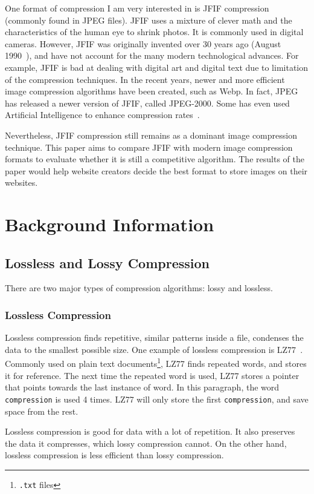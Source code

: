 \documentclass{article}
\begin{document}
One format of compression I am very interested in is JFIF compression (commonly found in JPEG files).
JFIF uses a mixture of clever math and the characteristics of the human eye to shrink photos.
It is commonly used in digital cameras.
However, JFIF was originally invented over 30 years ago (August 1990~\autocite{jpeg}), and have not account for the many modern technological advances.
For example, JFIF is bad at dealing with digital art and digital text due to limitation of the compression techniques.
In the recent years, newer and more efficient image compression algorithms have been created, such as Webp. 
In fact, JPEG has released a newer version of JFIF, called JPEG-2000.
Some has even used Artificial Intelligence to enhance compression rates~\autocite{googleAI}.

Nevertheless, JFIF compression still remains as a dominant image compression technique.
This paper aims to compare JFIF with modern image compression formats to evaluate whether it is still a competitive algorithm.
The results of the paper would help website creators decide the best format to store images on their websites.

\section{Background Information}

\subsection{Lossless and Lossy Compression}
\noindent There are two major types of compression algorithms: lossy and lossless.

\subsubsection{Lossless Compression}
Lossless compression finds repetitive, similar patterns inside a file, condenses the data to the smallest possible size.
One example of lossless compression is LZ77~\autocite{lzYT}.
Commonly used on plain text documents\footnote{\texttt{.txt} files}, LZ77 finds repeated words, and stores it for reference.
The next time the repeated word is used, LZ77 stores a pointer that points towards the last instance of word.
In this paragraph, the word \texttt{compression} is used 4 times.
LZ77 will only store the first \texttt{compression}, and save space from the rest.

Lossless compression is good for data with a lot of repetition.
It also preserves the data it compresses, which lossy compression cannot.
On the other hand, lossless compression is less efficient than lossy compression.
\end{document}
